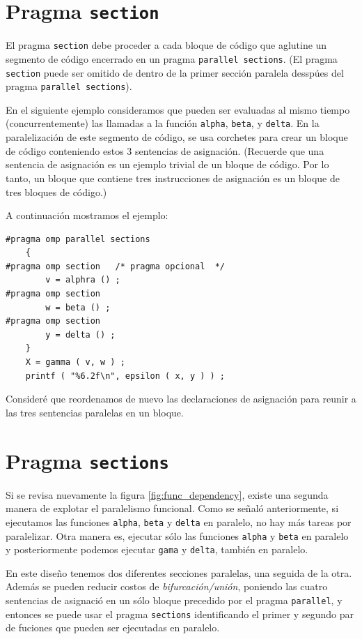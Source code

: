 \documentclass[12pt,letterpaper]{book}
\begin{document}
\section{Pragma \texttt{section}}
El pragma \texttt{section} debe proceder a cada bloque de código que aglutine un segmento de código encerrado en un pragma \texttt{parallel sections}. (El pragma \texttt{section} puede ser omitido de dentro de la primer sección paralela desspúes del pragma \texttt{parallel sections}).

En el siguiente ejemplo consideramos que pueden ser evaluadas al mismo tiempo (concurrentemente) las llamadas a la función \texttt{alpha}, \texttt{beta}, y \texttt{delta}. En la paralelización de este segmento de código, se usa corchetes para crear un bloque de código conteniendo estos 3 sentencias de asignación. (Recuerde que una sentencia de asignación es un ejemplo trivial de un bloque de código. Por lo tanto, un bloque que contiene tres instrucciones de asignación es un bloque de tres bloques de código.)

A continuación mostramos el ejemplo:

\begin{lstlisting}[style=C]
#pragma omp parallel sections
	{
#pragma omp section	  /* pragma opcional  */
		v = alphra () ;
#pragma omp section
		w = beta () ;
#pragma omp section
		y = delta () ;
	}
	X = gamma ( v, w ) ;
	printf ( "%6.2f\n", epsilon ( x, y ) ) ;
\end{lstlisting}

Consideré que reordenamos de nuevo las declaraciones de asignación para reunir a las tres sentencias paralelas en un bloque.


\section{Pragma \texttt{sections}}

Si se revisa nuevamente la figura \ref{fig:func_dependency}, existe una segunda manera de explotar el paralelismo funcional. Como se señaló anteriormente, si ejecutamos las funciones \texttt{alpha}, \texttt{beta} y \texttt{delta} en paralelo, no hay más tareas por paralelizar. Otra manera es, ejecutar sólo las funciones \texttt{alpha} y \texttt{beta} en paralelo y posteriormente podemos ejecutar \texttt{gama} y \texttt{delta}, también en paralelo.

En este diseño tenemos dos diferentes secciones paralelas, una seguida de la otra. Además se pueden reducir costos de \textit{bifurcación/unión}, poniendo las cuatro sentencias de asignació en un sólo bloque precedido por el pragma \texttt{parallel}, y entonces se puede usar el pragma \texttt{sections} identificando el primer y segundo par de fuciones que pueden ser ejecutadas en paralelo.
\end{document}
